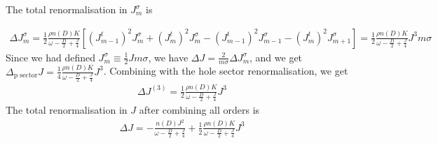 \documentclass[reprint,prb,superscriptaddress]{revtex4-2}
\begin{document}
The total renormalisation in  \(J^\sigma_m\) is
\begin{widetext}
\begin{equation}\begin{aligned}
	\Delta J^\sigma_m = \frac{1}{2}\frac{\rho n(D) K}{\omega - \frac{D}{2} + \frac{J}{4}}\left[\left( J^t_{m-1} \right)^2 J^\sigma_m + \left( J^t_m \right)^2 J^\sigma_m - \left( J^t_{m-1} \right)^2 J^\sigma_{m-1} - \left(J^t_m\right)^2 J^\sigma_{m+1} \right] = \frac{1}{2}\frac{\rho n(D) K}{\omega - \frac{D}{2} + \frac{J}{4}}J^3 m \sigma
\end{aligned}\end{equation}
Since we had defined \(J^\sigma_m \equiv \frac{1}{2}J m \sigma\), we have \(\Delta J = \frac{2}{m\sigma}\Delta J^\sigma_m\), and we get \(\Delta_\text{p sector} J = \frac{1}{4}\frac{\rho n(D) K}{\omega - \frac{D}{2} + \frac{J}{4}}J^3\).
Combining with the hole sector renormalisation, we get
\begin{equation}\begin{aligned}
	\Delta J^{(3)} = \frac{1}{2}\frac{\rho n(D) K}{\omega - \frac{D}{2} + \frac{J}{4}}J^3
\end{aligned}\end{equation}
The total renormalisation in \(J\) after combining all orders is
\begin{equation}\begin{aligned}
	\Delta J = -\frac{n(D) J^2}{\omega - \frac{D}{2} + \frac{J}{4}} + \frac{1}{2}\frac{\rho n(D) K}{\omega - \frac{D}{2} + \frac{J}{4}}J^3
\end{aligned}\end{equation}
\end{widetext}



\end{document}
